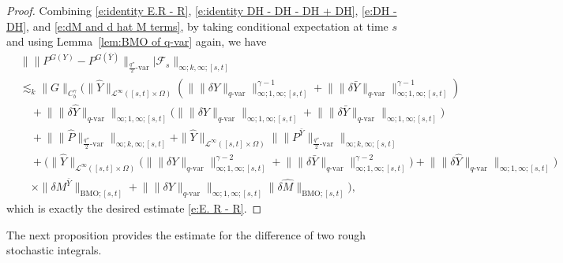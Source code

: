 \documentclass[11pt,reqno]{amsart}
\numberwithin{equation}{section}
\begin{document}
\begin{proof}
Combining \eqref{e:identity E.R - R}, \eqref{e:identity DH - DH - DH + DH}, \eqref{e:DH - DH},  and \eqref{e:dM and d hat M terms}, by taking conditional expectation at time $s$ and using Lemma~\ref{lem:BMO of q-var} again, we have
\begin{equation*}
\begin{aligned}
&\big\| \| P^{G(Y)} - P^{G(\bar Y)} \|_{\frac{q''}{2}\text{-}\mathrm{var}} \big| \mathcal F_s \big\|_{\infty;k,\infty;[s,t]} \\
&\lesssim_k \|G\|_{C^{\gamma}_b}\bigg(  \|\hat Y\|_{\mathcal L^{\infty}([s,t] \times \Omega)} (\big\| \|\delta Y\|_{q\text{-}\mathrm{var}} \big\|^{\gamma - 1}_{\infty;1,\infty;[s,t]} + \big\| \|\delta \bar Y\|_{q\text{-}\mathrm{var}} \big\|^{\gamma - 1}_{\infty;1,\infty;[s,t]}) \\ 
&\quad + \big\| \|\delta \hat Y\|_{q\text{-}\mathrm{var}} \big\|_{\infty;1,\infty;[s,t]} \big( \big\| \|\delta Y\|_{q\text{-}\mathrm{var}} \big\|_{\infty;1,\infty;[s,t]} + \big\| \|\delta \bar Y\|_{q\text{-}\mathrm{var}} \big\|_{\infty;1,\infty;[s,t]} \big) \\
&\quad + \big\| \|\hat P\|_{\frac{q''}{2}\text{-}\mathrm{var}} \big\|_{\infty;k,\infty;[s,t]} + \|\hat Y\|_{\mathcal L^{\infty}([s,t]\times\Omega)} \big\| \| P^{\bar Y} \|_{\frac{q''}{2}\text{-}\mathrm{var}} \big\|_{\infty;k,\infty;[s,t]} \\
&\quad + \Big( \|\hat Y\|_{\mathcal L^{\infty}([s,t]\times\Omega)} \big( \big\| \|\delta Y\|_{q\text{-}\mathrm{var}} \big\|^{\gamma - 2}_{\infty;1,\infty;[s,t]} + \big\| \|\delta \bar Y\|_{q\text{-}\mathrm{var}} \big\|^{\gamma - 2}_{\infty;1,\infty;[s,t]} \big) + \big\| \|\delta \hat Y\|_{q\text{-}\mathrm{var}} \big\|_{\infty;1,\infty;[s,t]} \Big)  \\
&\quad \times \|\delta M^{\bar Y}\|_{\mathrm{BMO};[s,t]} + \big\| \|\delta Y\|_{q\text{-}\mathrm{var}} \big\|_{\infty;1,\infty;[s,t]} \|\delta \hat M\|_{\mathrm{BMO};[s,t]} \bigg),
\end{aligned}
\end{equation*}
which is exactly the desired estimate \eqref{e:E. R - R}. 
\end{proof}

The next proposition provides the estimate for the difference of two rough stochastic integrals.  
 
\end{document}
